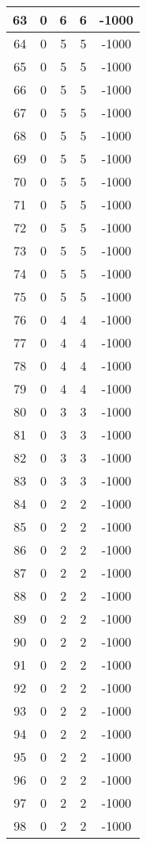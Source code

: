 \documentclass[letterpaper, 12pt]{article}
\begin{document}
\begin{longtable}{|c|c|c|c|c|}
\hline
63 & 0 & 6 & 6 & -1000 \\
\hline
64 & 0 & 5 & 5 & -1000 \\
\hline
65 & 0 & 5 & 5 & -1000 \\
\hline
66 & 0 & 5 & 5 & -1000 \\
\hline
67 & 0 & 5 & 5 & -1000 \\
\hline
68 & 0 & 5 & 5 & -1000 \\
\hline
69 & 0 & 5 & 5 & -1000 \\
\hline
70 & 0 & 5 & 5 & -1000 \\
\hline
71 & 0 & 5 & 5 & -1000 \\
\hline
72 & 0 & 5 & 5 & -1000 \\
\hline
73 & 0 & 5 & 5 & -1000 \\
\hline
74 & 0 & 5 & 5 & -1000 \\
\hline
75 & 0 & 5 & 5 & -1000 \\
\hline
76 & 0 & 4 & 4 & -1000 \\
\hline
77 & 0 & 4 & 4 & -1000 \\
\hline
78 & 0 & 4 & 4 & -1000 \\
\hline
79 & 0 & 4 & 4 & -1000 \\
\hline
80 & 0 & 3 & 3 & -1000 \\
\hline
81 & 0 & 3 & 3 & -1000 \\
\hline
82 & 0 & 3 & 3 & -1000 \\
\hline
83 & 0 & 3 & 3 & -1000 \\
\hline
84 & 0 & 2 & 2 & -1000 \\
\hline
85 & 0 & 2 & 2 & -1000 \\
\hline
86 & 0 & 2 & 2 & -1000 \\
\hline
87 & 0 & 2 & 2 & -1000 \\
\hline
88 & 0 & 2 & 2 & -1000 \\
\hline
89 & 0 & 2 & 2 & -1000 \\
\hline
90 & 0 & 2 & 2 & -1000 \\
\hline
91 & 0 & 2 & 2 & -1000 \\
\hline
92 & 0 & 2 & 2 & -1000 \\
\hline
93 & 0 & 2 & 2 & -1000 \\
\hline
94 & 0 & 2 & 2 & -1000 \\
\hline
95 & 0 & 2 & 2 & -1000 \\
\hline
96 & 0 & 2 & 2 & -1000 \\
\hline
97 & 0 & 2 & 2 & -1000 \\
\hline
98 & 0 & 2 & 2 & -1000 \\

\end{longtable}
\end{document}
